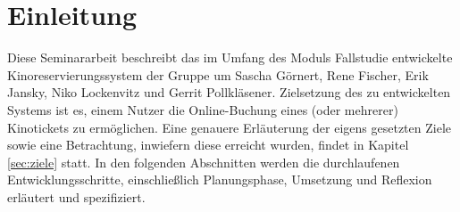 \chapter{Einleitung}

Diese Seminararbeit beschreibt das im Umfang des Moduls Fallstudie entwickelte Kinoreservierungssystem der Gruppe um Sascha Görnert, Rene Fischer, Erik Jansky, Niko Lockenvitz und Gerrit Pollkläsener.
Zielsetzung des zu entwickelten Systems ist es, einem Nutzer die Online-Buchung eines (oder mehrerer) Kinotickets zu ermöglichen.
Eine genauere Erläuterung der eigens gesetzten Ziele sowie eine Betrachtung, inwiefern diese erreicht wurden, findet in Kapitel \vref{sec:ziele} statt.
In den folgenden Abschnitten werden die durchlaufenen Entwicklungsschritte, einschließlich Planungsphase, Umsetzung und Reflexion erläutert und spezifiziert.